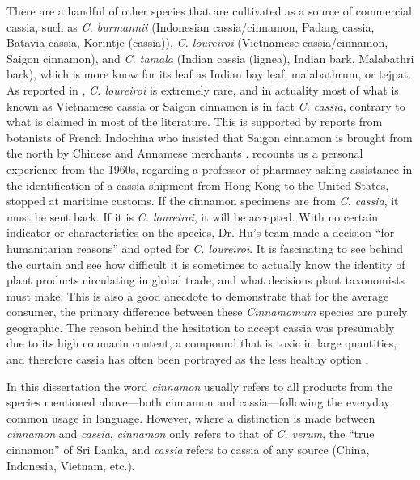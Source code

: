 There are a handful of other species that are cultivated as a source of commercial cassia, such as \textit{C. burmannii} (Indonesian cassia/cinnamon, Padang cassia, Batavia cassia, Korintje (cassia)), \textit{C. loureiroi} (Vietnamese cassia/cinnamon, Saigon cinnamon), and \textit{C. tamala} (Indian cassia (lignea), Indian bark, Malabathri bark), which is more know for its leaf as Indian bay leaf, malabathrum, or tejpat. As reported in \textcite[10]{ravindran_cinnamon_2004}, \textit{C. loureiroi} is extremely rare, and in actuality most of what is known as Vietnamese cassia or Saigon cinnamon is in fact \textit{C. cassia}, contrary to what is claimed in most of the literature. This is supported by reports from botanists of French Indochina who insisted that Saigon cinnamon is brought from the north by Chinese and Annamese merchants \parencite[400]{hu_food_2005}. \textcite{hu_food_2005} recounts us a personal experience from the 1960s, regarding a professor of pharmacy asking assistance in the identification of a cassia shipment from Hong Kong to the United States, stopped at maritime customs. If the cinnamon specimens are from \textit{C. cassia}, it must be sent back. If it is \textit{C. loureiroi}, it will be accepted. With no certain indicator or characteristics on the species, Dr. Hu's team made a decision ``for humanitarian reasons'' and opted for \textit{C. loureiroi}. It is fascinating to see behind the curtain and see how difficult it is sometimes to actually know the identity of plant products circulating in global trade, and what decisions plant taxonomists must make. This is also a good anecdote to demonstrate that for the average consumer, the primary difference between these \textit{Cinnamomum} species are purely geographic. The reason behind the hesitation to accept cassia was presumably due to its high coumarin content, a compound that is toxic in large quantities, and therefore cassia has often been portrayed as the less healthy option \autocite{dinesh_controversies_2015}.

\begin{note}
In this dissertation the word \textit{cinnamon} usually refers to all products from the species mentioned above---both cinnamon and cassia---following the everyday common usage in language. However, where a distinction is made between \textit{cinnamon} and \textit{cassia}, \textit{cinnamon} only refers to that of \textit{C. verum}, the ``true cinnamon'' of Sri Lanka, and \textit{cassia} refers to cassia of any source (China, Indonesia, Vietnam, etc.).
\end{note}

